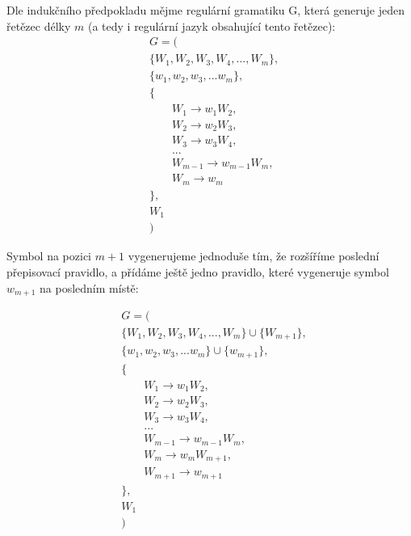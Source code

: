 \documentclass[10pt]{article}
\begin{document}
\begin{description}
        Dle indukčního předpokladu mějme regulární gramatiku G, která generuje jeden řetězec délky $m$ (a tedy i regulární jazyk obsahující tento řetězec):
        \begin{align*}
            & G = ( \\
            &\{W_1, W_2, W_3, W_4, ..., W_m\}, \\
            &\{w_1, w_2, w_3, ... w_m\}, \\
            &\{\\
            &\qquad W_1 \rightarrow w_{1}W_2, \\
            &\qquad W_2 \rightarrow w_{2}W_3, \\
            &\qquad W_3 \rightarrow w_{3}W_4, \\
            &\qquad ... \\
            &\qquad W_{m-1} \rightarrow w_{m-1}W_m, \\
            &\qquad W_{m} \rightarrow w_{m} \\
            &\},\\
            &W_1\\
            &)
        \end{align*}

        Symbol na pozici $m + 1$ vygenerujeme jednoduše tím, že rozšíříme poslední přepisovací pravidlo, a přídáme ještě jedno pravidlo, které vygeneruje symbol $w_{m + 1}$ na posledním místě:

        \begin{align*}
            & G = ( \\
            &\{W_1, W_2, W_3, W_4, ..., W_m\} \cup \{W_{m+1}\}, \\
            &\{w_1, w_2, w_3, ... w_m\} \cup \{w_{m+1}\}, \\
            &\{\\
            &\qquad W_1 \rightarrow w_{1}W_2, \\
            &\qquad W_2 \rightarrow w_{2}W_3, \\
            &\qquad W_3 \rightarrow w_{3}W_4, \\
            &\qquad ... \\
            &\qquad W_{m-1} \rightarrow w_{m-1}W_m, \\
            &\qquad W_{m} \rightarrow w_{m}W_{m+1}, \\
            &\qquad W_{m+1} \rightarrow w_{m+1} \\
            &\},\\
            &W_1\\
            &)
        \end{align*}


\end{description}
\end{document}
